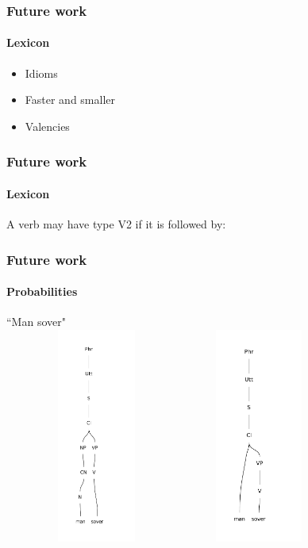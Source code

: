 \documentclass[10pt]{beamer}
\renewcommand{\baselinestretch}{1.5}
\begin{document}
\begin{frame}
 \renewcommand{\baselinestretch}{1.0}
\frametitle{Future work}
\framesubtitle{Lexicon} 
\begin{itemize}
\item Idioms
\item Faster and smaller
\item Valencies
\end{itemize}
\end{frame}


\begin{frame}
 \renewcommand{\baselinestretch}{1.0}
\frametitle{Future work}
\framesubtitle{Lexicon} 
A verb may have type V2 if it is followed by:
\end{frame}


\begin{frame}
\renewcommand{\baselinestretch}{1.0}
\frametitle{Future work}
\framesubtitle{Probabilities} 
\center
``Man sover"\\
\includegraphics[width=170pt,height=200pt]{man1.pdf}
\includegraphics[width=130pt,height=200pt]{man.pdf}
\end{frame}
\end{document}
